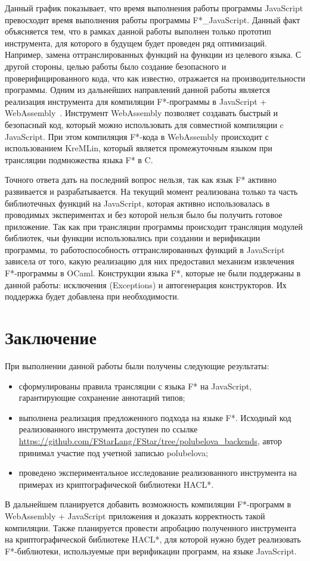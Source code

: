\documentclass[12pt]{matmex-diploma}
\begin{document}
Данный график показывает, что время выполнения работы программы JavaScript превосходит время выполнения работы программы F*\_JavaScript. Данный факт объясняется тем, что в рамках данной работы выполнен только прототип инструмента, для которого в будущем будет проведен ряд оптимизаций. Например, замена оттранслированных функций на функции из целевого языка. С другой стороны, целью работы было создание безопасного и проверифицированного кода, что как известно, отражается на производительности программы. Одним из дальнейших направлений данной работы является реализация инструмента для компиляции F*-программы в JavaScript + WebAssembly~\cite{wasm}. Инструмент WebAssembly позволяет создавать быстрый и безопасный код, который можно использовать для совместной компиляции c JavaScript. При этом компиляция F*-кода в WebAssembly происходит с использованием KreMLin, который является промежуточным языком при трансляции подмножества языка F* в C. 

Точного ответа дать на последний вопрос нельзя, так как язык F* активно развивается и разрабатывается. На текущий момент реализована только та часть библиотечных функций на JavaScript, которая активно использовалась в проводимых экспериментах и без которой нельзя было бы получить готовое приложение. Так как при трансляции программы происходит трансляция модулей библиотек, чьи функции использовались при создании и верификации программы, то работоспособность оттранслированных функций в JavaScript зависела от того, какую реализацию для них предоставил механизм извлечения F*-программы в OCaml. Конструкции языка F*, которые не были поддержаны в данной работы: исключения (Exceptions) и автогенерация конструкторов. Их поддержка будет добавлена при необходимости. 


\section*{Заключение}
При выполнении данной работы были получены следующие результаты:
\begin{itemize}
\item сформулированы правила трансляции с языка F* на JavaScript, гарантирующие сохранение аннотаций типов;
\item выполнена реализация предложенного подхода на языке F*. Исходный код реализованного инструмента доступен по ссылке {\small \url{https://github.com/FStarLang/FStar/tree/polubelova_backends}}, автор принимал участие под учетной записью polubelova;
\item проведено экспериментальное исследование реализованного инструмента на примерах из криптографической библиотеки HACL*.
\end{itemize}

В дальнейшем планируется добавить возможность компиляции F*-программ в WebAssembly + JavaScript приложения и доказать корректность такой компиляции. Также планируется провести апробацию полученного инструмента на криптографической библиотеке HACL*, для которой нужно будет реализовать F*-библиотеки, используемые при верификации программ, на языке JavaScript.


\setmonofont[Mapping=tex-text]{CMU Typewriter Text}


\end{document}
